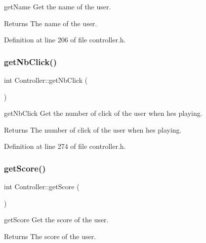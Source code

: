get\+Name Get the name of the user. 

\begin{DoxyReturn}{Returns}
The name of the user. 
\end{DoxyReturn}


Definition at line 206 of file controller.\+h.

\mbox{\label{class_controller_a1f5e158318b26e15a023391827617c04}} 
\subsubsection{\texorpdfstring{get\+Nb\+Click()}{getNbClick()}}
{\footnotesize\ttfamily int Controller\+::get\+Nb\+Click (\begin{DoxyParamCaption}{ }\end{DoxyParamCaption})\hspace{0.3cm}{\ttfamily [inline]}}



get\+Nb\+Click Get the number of click of the user when he\textquotesingle{}s playing. 

\begin{DoxyReturn}{Returns}
The number of click of the user when he\textquotesingle{}s playing. 
\end{DoxyReturn}


Definition at line 274 of file controller.\+h.

\mbox{\label{class_controller_a108724342a6e4b06b0574c3a7d615bb2}} 
\subsubsection{\texorpdfstring{get\+Score()}{getScore()}}
{\footnotesize\ttfamily int Controller\+::get\+Score (\begin{DoxyParamCaption}{ }\end{DoxyParamCaption})\hspace{0.3cm}{\ttfamily [inline]}}



get\+Score Get the score of the user. 

\begin{DoxyReturn}{Returns}
The score of the user. 
\end{DoxyReturn}


